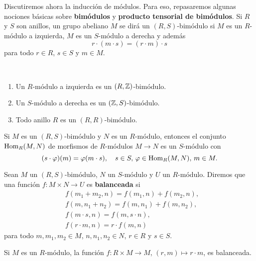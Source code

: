 Discutiremos ahora la inducción de módulos. Para eso, repasaremos algunas nociones básicas sobre
\textbf{bimódulos} y \textbf{producto tensorial de bimódulos}. 
Si $R$ y $S$ son anillos, un grupo abeliano $M$ se dirá un $(R,S)$-bimódulo si 
$M$ es un $R$-módulo a izquierda, $M$ es un $S$-módulo a derecha y además
\[
r\cdot (m\cdot s)=(r\cdot m)\cdot s
\]
para todo $r\in R$, $s\in S$ y $m\in M$. 

\begin{examples}\
\begin{enumerate}
    \item Un $R$-módulo a izquierda es un $(R,\mathbb{Z})$-bimódulo.
    \item Un $S$-módulo a derecha es un $(\mathbb{Z},S)$-bimódulo.
    \item Todo anillo $R$ es un $(R,R)$-bimódulo.
\end{enumerate}
\end{examples}

\begin{example}
Si $M$ es un $(R,S)$-bimódulo y $N$ es un $R$-módulo, entonces el conjunto 
$\operatorname{Hom}_R(M,N)$ de morfismos de $R$-módulos $M\to N$ es un 
$S$-módulo con 
\[
(s\cdot \varphi)(m)=\varphi(m\cdot s),\quad s\in S,\,\varphi\in\operatorname{Hom}_R(M,N),\,m\in M.
\]
\end{example}

Sean $M$ un $(R,S)$-bimódulo, $N$ un $S$-módulo y $U$ un $R$-módulo. 
Diremos que una función $f\colon M\times N\to U$ 
es \textbf{balanceada} si 
\begin{align*}
    &f(m_1+m_2,n)=f(m_1,n)+f(m_2,n),\\
    &f(m,n_1+n_2)=f(m,n_1)+f(m,n_2),\\
    &f(m\cdot s,n)=f(m,s\cdot n),\\
    &f(r\cdot m,n)=r\cdot f(m,n)
\end{align*}
para todo $m,m_1,m_2\in M$, $n,n_1,n_2\in N$, $r\in R$ y $s\in S$. 

\begin{example}
Si $M$ es un $R$-módulo, la función $f\colon R\times M\to M$, $(r,m)\mapsto r\cdot m$, es balanceada. 
\end{example}

